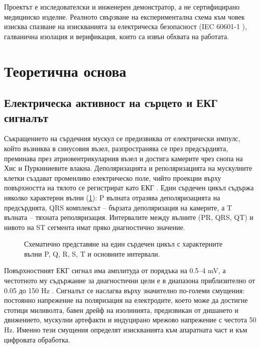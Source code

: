 \documentclass[12pt,a4paper]{article}
\begin{document}
Проектът е изследователски и инженерен демонстратор, а не сертифицирано медицинско изделие. Реалното свързване на експериментална схема към човек изисква спазване на изискванията за електрическа безопасност (IEC 60601-1 \cite{iec60601}), галванична изолация и верификация, които са извън обхвата на работата.

\section{Теоретична основа}

\subsection{Електрическа активност на сърцето и ЕКГ сигналът}
Съкращението на сърдечния мускул се предизвиква от електрически импулс, който възниква в синусовия възел, разпространява се през предсърдията, преминава през атриовентрикуларния възел и достига камерите чрез снопа на Хис и Пуркиниевите влакна. Деполяризацията и реполяризацията на мускулните клетки създават променливо електрическо поле, чийто проекции върху повърхността на тялото се регистрират като ЕКГ \cite{webster2010medical}. Един сърдечен цикъл съдържа няколко характерни вълни (\cref{fig:ecg_beat}): P вълната отразява деполяризацията на предсърдията, QRS комплексът -- бързата деполяризация на камерите, а T вълната -- тяхната реполяризация. Интервалите между вълните (PR, QRS, QT) и нивото на ST сегмента имат пряко диагностично значение.

\begin{figure}[htbp]
    \centering
    
    \caption{Схематично представяне на един сърдечен цикъл с характерните вълни P, Q, R, S, T и основните интервали.}
    \label{fig:ecg_beat}
\end{figure}

Повърхностният ЕКГ сигнал има амплитуда от порядъка на 0.5--4 mV, а честотното му съдържание за диагностични цели е в диапазона приблизително от 0.05 до 150 Hz \cite{kligfield2007aha}. Сигналът се наслагва върху значително по-големи смущения: постоянно напрежение на поляризация на електродите, което може да достигне стотици миливолта, бавен дрейф на изолинията, предизвикан от дишането и движението, мускулни артефакти и индуцирано мрежово напрежение с честота 50 Hz. Именно тези смущения определят изискванията към апаратната част и към цифровата обработка.
\end{document}
